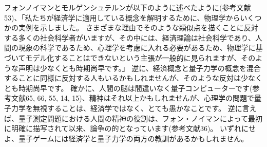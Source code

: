 フォンノイマンとモルゲンシュテルンが以下のように述べたように(参考文献53)、「私たちが経済学に適用している概念を解明するために、物理学からいくつかの実例を示しました。
さまざまな理由でそのような類似点を描くことに反対する多くの社会科学者がいますが、その中には、経済理論は社会科学であり、人間の現象の科学であるため、心理学を考慮に入れる必要があるため、物理学に基づいてモデル化することはできないという主張が一般的に見られますが、そのような声明は少なくとも時期尚早です。」
逆に、経済概念と量子力学の概念を混合することに同様に反対する人もいるかもしれませんが、そのような反対は少なくとも時期尚早です。
確かに、人間の脳は間違いなく量子コンピューターです(参考文献65, 66, 55, 14, 15)、精神はそれ以上かもしれませんが、心理学の問題で量子力学を無視することは、経済学ではなく、とても愚かなことです。 
逆に言えば、量子測定問題における人間の精神の役割は、フォン・ノイマンによって最初に明確に描写されて以来、論争の的となっています(参考文献36)。 いずれにせよ、量子ゲームには経済学と量子力学の両方の教訓があるかもしれません。

